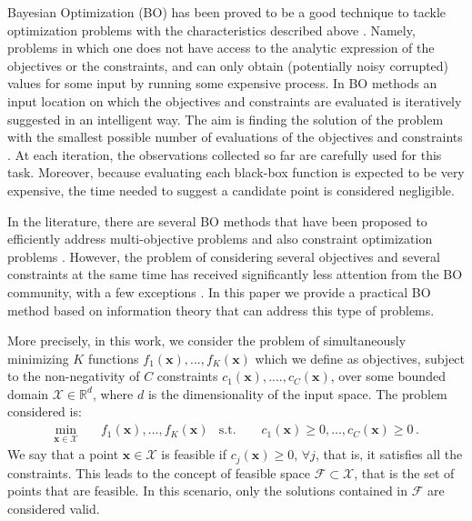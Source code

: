 \documentclass[review,preprint,12pt]{elsarticle}
\begin{document}
Bayesian Optimization (BO)  has been proved to be a good technique to tackle optimization 
problems with the characteristics described above \citep{mockus1978application}. 
Namely, problems in which one does not have access to the analytic expression of the objectives 
or the constraints, and can only obtain (potentially noisy corrupted) values for some input 
by running some expensive process. In BO methods an input location on which the objectives and constraints
are evaluated is iteratively suggested in an intelligent way. The aim is  finding the solution of 
the problem with the smallest possible number of evaluations of the objectives and constraints 
\citep{brochu2010tutorial,shahriari2016taking}. At each iteration, the observations collected so far are 
carefully used for this task. Moreover, because evaluating each black-box function is expected to 
be very expensive, the time needed to suggest a candidate point is considered negligible. 

In the literature, there are several BO methods that 
have been proposed to efficiently address multi-objective problems \citep{knowles2006parego,
ponweiser2008multiobjective,Emm08,picheny2015multiobjective,hernandez2016predictive} and also 
constraint optimization problems \citep{gelbart2014bayesian,hernandez2015predictive,hernandez2016general}. 
However, the problem of considering several objectives and several constraints at the same time 
has received significantly less attention from the BO community, with a few exceptions 
\citep{feliot2015bayesian}. In this paper we provide a practical BO method based 
on information theory that can address this type of problems.

More precisely, in this work, we consider the problem of simultaneously minimizing 
$K$ functions $f_1(\mathbf{x}),...,f_K(\mathbf{x})$ which we define as objectives, 
subject to the non-negativity of $C$ constraints $c_1(\textbf{x}),....,c_C(\textbf{x}) $, 
over some bounded domain $\mathcal{X} \in \mathds{R}^d$, where $d$ is the dimensionality 
of the input space. The problem considered is:
\begin{align}
\underset{\mathbf{x} \in \mathcal{X}}{\text{min}} & \quad f_1(\mathbf{x}), \ldots, f_K(\mathbf{x}) & 
\text{s.t.} \quad \quad c_1(\mathbf{x}) \geq 0, \ldots, c_C(\mathbf{x}) \geq 0\,.
\label{eq:optimization}
\end{align}
We say that a point $\mathbf{x} \in \mathcal{X}$ is feasible if $c_j(\mathbf{x})\geq 0$, $\forall j$, 
that is, it satisfies all the constraints. This leads to the concept of feasible space $\mathcal{F} 
\subset \mathcal{X}$, that is the set of points that are feasible. In this scenario, only the solutions 
contained in $\mathcal{F}$ are considered valid. 
\end{document}
